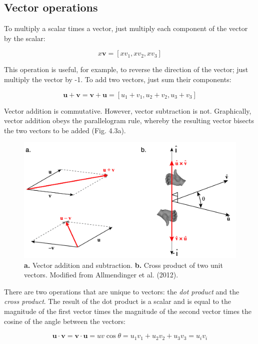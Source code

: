 \documentclass[a4paper , 12pt]{book}
\begin{document}
\subsection{Vector operations}
To multiply a scalar times a vector, just multiply each component of the vector by the scalar:

\begin{equation}
    x\mathbf v=[xv_1,xv_2,xv_3]
\end{equation}

This operation is useful, for example, to reverse the direction of the vector; just multiply the vector by -1.
To add two vectors, just sum their components:

\begin{equation}
    \mathbf u + \mathbf v=\mathbf v+\mathbf u=[u_1+v_1,u_2+v_2,u_3+v_3]
\end{equation}

Vector addition is commutative. However, vector subtraction is not. Graphically, vector addition obeys the parallelogram rule, whereby the resulting vector bisects the two vectors to be added (Fig. 4.3a).

\begin{figure}[ht]
    \centering
    \includegraphics[width=13cm]{Figures/ch4f3.png}
    \caption{\textbf{a.} Vector addition and subtraction. \textbf{b.} Cross product of two unit vectors. Modified from Allmendinger et al. (2012).}
\end{figure}

There are two operations that are unique to vectors: the \textit{dot product} and the \textit{cross product}. The result of the dot product is a scalar and is equal to the magnitude of the first vector times the magnitude of the second vector times the cosine of the angle between the vectors:

\begin{equation}
    \mathbf u \cdot\mathbf v=\mathbf v \cdot\mathbf u=uv\cos\theta=u_1v_1+u_2v_2+u_3v_3=u_iv_i
\end{equation}
\end{document}
